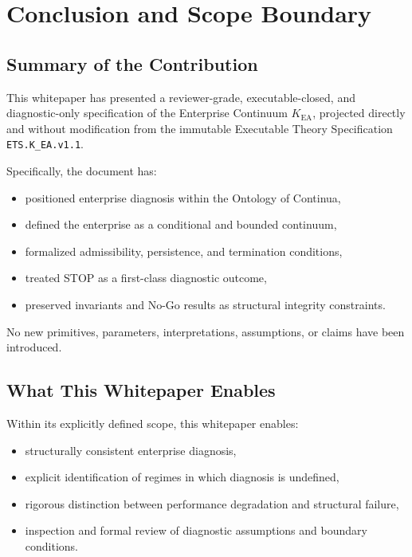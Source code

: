 
\section{Conclusion and Scope Boundary}

\subsection{Summary of the Contribution}

This whitepaper has presented a reviewer-grade, executable-closed, and
diagnostic-only specification of the Enterprise Continuum
$K_{\mathrm{EA}}$, projected directly and without modification from the
immutable Executable Theory Specification \texttt{ETS.K\_EA.v1.1}.

Specifically, the document has:
\begin{itemize}
  \item positioned enterprise diagnosis within the Ontology of Continua,
  \item defined the enterprise as a conditional and bounded continuum,
  \item formalized admissibility, persistence, and termination
        conditions,
  \item treated STOP as a first-class diagnostic outcome,
  \item preserved invariants and No-Go results as structural integrity
        constraints.
\end{itemize}

No new primitives, parameters, interpretations, assumptions, or claims
have been introduced.

\subsection{What This Whitepaper Enables}

Within its explicitly defined scope, this whitepaper enables:
\begin{itemize}
  \item structurally consistent enterprise diagnosis,
  \item explicit identification of regimes in which diagnosis is
        undefined,
  \item rigorous distinction between performance degradation and
        structural failure,
  \item inspection and formal review of diagnostic assumptions and
        boundary conditions.
\end{itemize}

